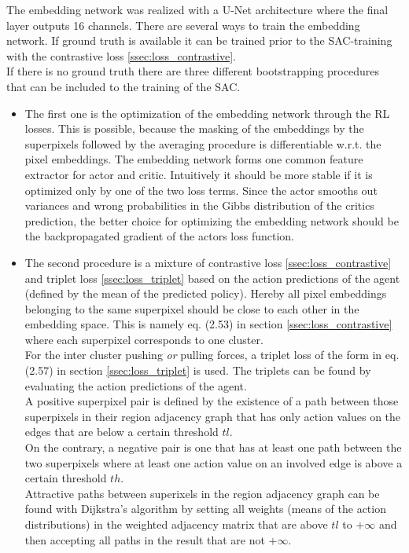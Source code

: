 The embedding network was realized with a U-Net architecture \cite{ronneberger2015unet} where the final layer outputs 16 channels. There are several ways to train the embedding network. If ground truth is available it can be trained prior to the SAC-training with the contrastive loss \ref{ssec:loss_contrastive}.\\
If there is no ground truth there are three different bootstrapping procedures that can be included to the training of the SAC.\\
\begin{itemize}
 	\item The first one is the optimization of the embedding network through the RL losses. This is possible, because the masking of the embeddings by the superpixels followed by the averaging procedure is differentiable w.r.t. the pixel embeddings. The embedding network forms one common feature extractor for actor and critic. Intuitively it should be more stable if it is optimized only by one of the two loss terms. Since the actor smooths out variances and wrong probabilities in the Gibbs distribution of the critics prediction, the better choice for optimizing the embedding network should be the backpropagated gradient of the actors loss function.
 	\item The second procedure is a mixture of contrastive loss \ref{ssec:loss_contrastive} and triplet loss \ref{ssec:loss_triplet} based on the action predictions of the agent (defined by the mean of the predicted policy). Hereby all pixel embeddings belonging to the same superpixel should be close to each other in the embedding space. This is namely eq. (2.53) in section \ref{ssec:loss_contrastive} where each superpixel corresponds to one cluster.\\
 	For the inter cluster pushing \emph{or} pulling forces, a triplet loss of the form in eq. (2.57) in section \ref{ssec:loss_triplet} is used. The triplets can be found by evaluating the action predictions of the agent.\\
 	A positive superpixel pair is defined by the existence of a path between those superpixels in their region adjacency graph that has only action values on the edges that are below a certain threshold $tl$.\\
 	On the contrary, a negative pair is one that has at least one path between the two superpixels where at least one action value on an involved edge is above a certain threshold $th$.\\
 	Attractive paths between superixels in the region adjacency graph can be found with Dijkstra's algorithm by setting all weights (means of the action distributions) in the weighted adjacency matrix that are above $tl$ to $+\infty$ and then accepting all paths in the result that are not $+\infty$.\\

\end{itemize}
